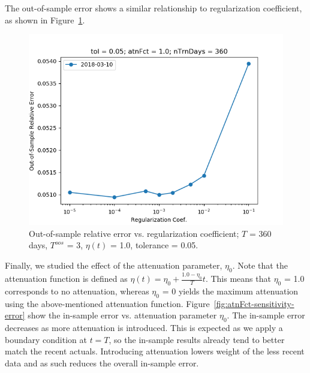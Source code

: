\documentclass{article}
\begin{document}
The out-of-sample error shows a similar relationship to regularization
coefficient, as shown in
Figure~\ref{fig:regCoef-sensitivity-oos-error}.

\begin{figure}\label{fig:regCoef-sensitivity-oos-error}
\includegraphics[bb=0 0 640 480]{figures/regCoef-sensitivity-oos-error.png}
\caption{Out-of-sample relative error vs. regularization coefficient;
  $T$ = 360 days, $T^{oos}$ = 3, $\eta(t)$ = 1.0, tolerance = 0.05.}
\end{figure}

Finally, we studied the effect of the attenuation parameter,
$\eta_{0}$. Note that the attenuation function is defined as
$\eta(t) = \eta_{0} + \frac{1.0 - \eta_{0}}{T} t$. This means that
$\eta_{0}$ = 1.0 corresponds to no attenuation, whereas $\eta_{0}$ = 0
yields the maximum attenuation using the above-mentioned attenuation
function. Figure~\ref{fig:atnFct-sensitivity-error} show the in-sample
error vs. attenuation parameter $\eta_{0}$. The in-sample error
decreases as more attenuation is introduced. This is expected as we
apply a boundary condition at $t = T$, so the in-sample results
already tend to better match the recent actuals. Introducing
attenuation lowers weight of the less recent data and as such reduces
the overall in-sample error.
\end{document}
